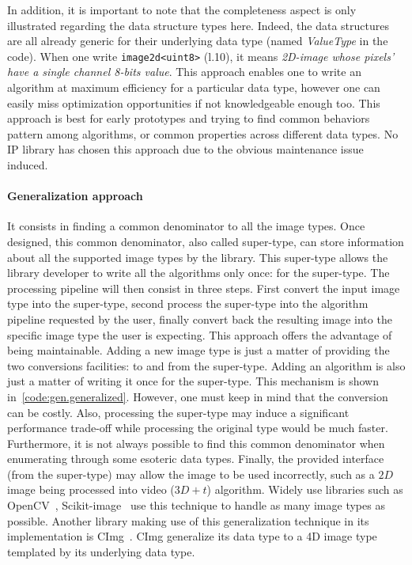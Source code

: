 In addition, it is important to note that the completeness aspect is only illustrated regarding the data structure types
here. Indeed, the data structures are all already generic for their underlying data type (named \emph{ValueType} in the
code). When one write \texttt{image2d<uint8>} (l.10), it means \emph{2D-image whose pixels' have a single channel 8-bits
  value}. This approach enables one to write an algorithm at maximum efficiency for a particular data type, however one
can easily miss optimization opportunities if not knowledgeable enough too. This approach is best for early prototypes
and trying to find common behaviors pattern among algorithms, or common properties across different data types. No IP
library has chosen this approach due to the obvious maintenance issue induced.

\paragraph{Generalization approach} It consists in finding a common denominator to all the image types. Once designed,
this common denominator, also called super-type, can store information about all the supported image types by the
library. This super-type allows the library developer to write all the algorithms only once: for the super-type. The
processing pipeline will then consist in three steps. First convert the input image type into the super-type, second
process the super-type into the algorithm pipeline requested by the user, finally convert back the resulting image into
the specific image type the user is expecting. This approach offers the advantage of being maintainable. Adding a new
image type is just a matter of providing the two conversions facilities: to and from the super-type. Adding an algorithm
is also just a matter of writing it once for the super-type. This mechanism is shown in~\ref{code:gen.generalized}.
However, one must keep in mind that the conversion can be costly. Also, processing the super-type may induce a
significant performance trade-off while processing the original type would be much faster. Furthermore, it is not always
possible to find this common denominator when enumerating through some esoteric data types. Finally, the provided
interface (from the super-type) may allow the image to be used incorrectly, such as a \(2D\) image being processed into
video (\(3D+t\)) algorithm. Widely use libraries such as OpenCV~\parencite{bradski.2000.opencv},
Scikit-image~\parencite{vanderwalt.2014.skimage} use this technique to handle as many image types as possible. Another
library making use of this generalization technique in its implementation is CImg~\parencite{tschumperle.2012.cimg}.
CImg generalize its data type to a 4D image type templated by its underlying data type.

